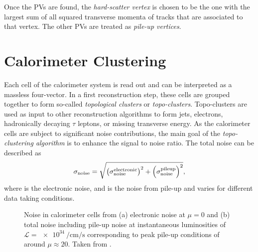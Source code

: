 Once the PVs are found, the \emph{hard-scatter vertex} is chosen to be the one with the largest sum of all squared transverse momenta of tracks that are associated to that vertex. The other PVs are treated as \emph{pile-up vertices}.




\section{Calorimeter Clustering}
Each cell of the calorimeter system is read out and can be interpreted as a massless four-vector. In a first reconstruction step, these cells are grouped together to form so-called \emph{topological clusters} or \emph{topo-clusters}. Topo-clusters are used as input to other reconstruction algorithms to form jets, electrons, hadronically decaying $\tau$ leptons, or missing transverse energy. 
As the calorimeter cells are subject to significant noise contributions, the main goal of the \emph{topo-clustering algorithm} is to enhance the signal to noise ratio. The total noise can be described as
\begin{equation}
    \sigma_{\text{noise}} = \sqrt{ \left( \sigma_{\text{noise}}^{\text{electronic}}  \right)^2  + \left( \sigma_{\text{noise}}^{\text{pileup}}  \right)^2 },
\end{equation}
where \electronicnoise is the electronic noise, and \pileupnoise is the noise from pile-up and varies for different data taking conditions. 

\begin{figure}
        
\caption{Noise in calorimeter cells from (a) electronic noise at $\mu=0$ and (b) total noise including pile-up noise at instantaneous luminosities of $\mathcal{L} = \SI{e34}{\per\cm\per\s}$ corresponding to peak pile-up conditions of around $\mu\approx20$. Taken from .}
\end{figure}


